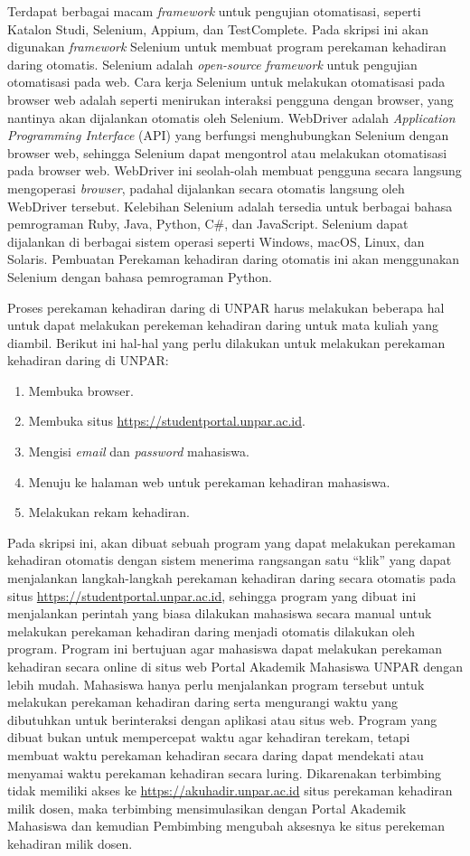 Terdapat berbagai macam \textit{framework} untuk pengujian otomatisasi, seperti Katalon Studi, Selenium, Appium, dan TestComplete. Pada skripsi ini akan digunakan \textit{framework} Selenium untuk membuat program perekaman kehadiran daring otomatis. Selenium adalah \textit{open-source} \textit{framework} untuk pengujian otomatisasi pada web\cite{selenium}. Cara kerja Selenium untuk melakukan otomatisasi pada browser web adalah seperti menirukan interaksi pengguna dengan browser, yang nantinya akan dijalankan otomatis oleh Selenium. WebDriver adalah \textit{Application Programming Interface} (API) yang berfungsi menghubungkan Selenium dengan browser web, sehingga Selenium dapat mengontrol atau melakukan otomatisasi pada browser web. WebDriver ini seolah-olah membuat pengguna secara langsung mengoperasi \textit{browser}, padahal dijalankan secara otomatis langsung oleh WebDriver tersebut. Kelebihan Selenium adalah tersedia untuk berbagai bahasa pemrograman Ruby, Java, Python, C\#, dan JavaScript. Selenium dapat dijalankan di berbagai sistem operasi seperti Windows, macOS, Linux, dan Solaris. Pembuatan Perekaman kehadiran daring otomatis ini akan menggunakan Selenium dengan bahasa pemrograman Python.  

Proses perekaman kehadiran daring di UNPAR harus melakukan beberapa hal untuk dapat melakukan perekeman kehadiran daring untuk mata kuliah yang diambil. Berikut ini hal-hal yang perlu dilakukan untuk melakukan perekaman kehadiran daring di UNPAR:
\begin{enumerate}
	\item Membuka browser.
	\item Membuka situs \url{https://studentportal.unpar.ac.id}.
	\item Mengisi \textit{email} dan \textit{password} mahasiswa.
	\item Menuju ke halaman web untuk perekaman kehadiran mahasiswa.
	\item Melakukan rekam kehadiran.
\end{enumerate}
Pada skripsi ini, akan dibuat sebuah program yang dapat melakukan perekaman kehadiran otomatis dengan sistem menerima rangsangan satu ``klik'' yang dapat menjalankan langkah-langkah perekaman kehadiran daring secara otomatis pada situs \url{https://studentportal.unpar.ac.id}, sehingga program yang dibuat ini menjalankan perintah yang biasa dilakukan mahasiswa secara manual untuk melakukan perekaman kehadiran daring menjadi otomatis dilakukan oleh program.
Program ini bertujuan agar mahasiswa dapat melakukan perekaman kehadiran secara online di situs web Portal Akademik Mahasiswa UNPAR dengan lebih mudah. Mahasiswa hanya perlu menjalankan program tersebut untuk melakukan perekaman kehadiran daring serta mengurangi waktu yang dibutuhkan untuk berinteraksi dengan aplikasi atau situs web. Program yang dibuat bukan untuk mempercepat waktu agar kehadiran terekam, tetapi membuat waktu perekaman kehadiran secara daring dapat mendekati atau menyamai waktu perekaman kehadiran secara luring. Dikarenakan terbimbing tidak memiliki akses ke \url{https://akuhadir.unpar.ac.id} situs perekaman kehadiran milik dosen, maka terbimbing mensimulasikan dengan Portal Akademik Mahasiswa dan kemudian Pembimbing mengubah aksesnya ke situs perekeman kehadiran milik dosen.


